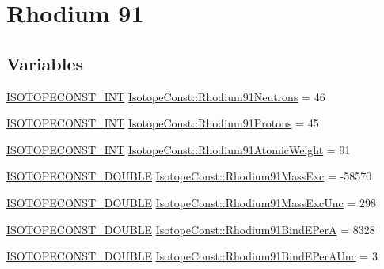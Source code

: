 \hypertarget{group___isotope_const-_rhodium-_rh91}{}\section{Rhodium 91}
\label{group___isotope_const-_rhodium-_rh91}
\subsection*{Variables}
\begin{DoxyCompactItemize}
\item 
\mbox{\hyperlink{group___isotope_const-_macros_ga5f18360b3e99483a35c32d789e62621c}{I\+S\+O\+T\+O\+P\+E\+C\+O\+N\+S\+T\+\_\+\+I\+NT}} \mbox{\hyperlink{group___isotope_const-_rhodium-_rh91_gae11d54be3b0e8502882440a3bb665b33}{Isotope\+Const\+::\+Rhodium91\+Neutrons}} = 46
\item 
\mbox{\hyperlink{group___isotope_const-_macros_ga5f18360b3e99483a35c32d789e62621c}{I\+S\+O\+T\+O\+P\+E\+C\+O\+N\+S\+T\+\_\+\+I\+NT}} \mbox{\hyperlink{group___isotope_const-_rhodium-_rh91_gad3dee80d05b6f08572ef7f2bebde5b05}{Isotope\+Const\+::\+Rhodium91\+Protons}} = 45
\item 
\mbox{\hyperlink{group___isotope_const-_macros_ga5f18360b3e99483a35c32d789e62621c}{I\+S\+O\+T\+O\+P\+E\+C\+O\+N\+S\+T\+\_\+\+I\+NT}} \mbox{\hyperlink{group___isotope_const-_rhodium-_rh91_ga475c9abf92863a1bc05e2fa4b7c1db0c}{Isotope\+Const\+::\+Rhodium91\+Atomic\+Weight}} = 91
\item 
\mbox{\hyperlink{group___isotope_const-_macros_ga8f45a7272ce02c0b4c65c44636ed719a}{I\+S\+O\+T\+O\+P\+E\+C\+O\+N\+S\+T\+\_\+\+D\+O\+U\+B\+LE}} \mbox{\hyperlink{group___isotope_const-_rhodium-_rh91_gaf18e0c6f96527ea825072f2e0302f7c0}{Isotope\+Const\+::\+Rhodium91\+Mass\+Exc}} = -\/58570
\item 
\mbox{\hyperlink{group___isotope_const-_macros_ga8f45a7272ce02c0b4c65c44636ed719a}{I\+S\+O\+T\+O\+P\+E\+C\+O\+N\+S\+T\+\_\+\+D\+O\+U\+B\+LE}} \mbox{\hyperlink{group___isotope_const-_rhodium-_rh91_gadfef2e31ad447482896afc0a537b8f7b}{Isotope\+Const\+::\+Rhodium91\+Mass\+Exc\+Unc}} = 298
\item 
\mbox{\hyperlink{group___isotope_const-_macros_ga8f45a7272ce02c0b4c65c44636ed719a}{I\+S\+O\+T\+O\+P\+E\+C\+O\+N\+S\+T\+\_\+\+D\+O\+U\+B\+LE}} \mbox{\hyperlink{group___isotope_const-_rhodium-_rh91_ga5e7f35e65643c74ac53b752d7b43a28f}{Isotope\+Const\+::\+Rhodium91\+Bind\+E\+PerA}} = 8328
\item 
\mbox{\hyperlink{group___isotope_const-_macros_ga8f45a7272ce02c0b4c65c44636ed719a}{I\+S\+O\+T\+O\+P\+E\+C\+O\+N\+S\+T\+\_\+\+D\+O\+U\+B\+LE}} \mbox{\hyperlink{group___isotope_const-_rhodium-_rh91_gabacdc218e0d014926e699dc30c4ce192}{Isotope\+Const\+::\+Rhodium91\+Bind\+E\+Per\+A\+Unc}} = 3

\end{DoxyCompactItemize}
